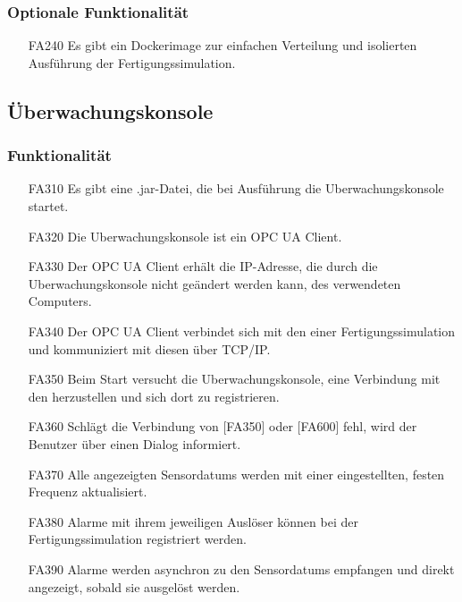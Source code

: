 \documentclass[parskip=full]{scrartcl}
\begin{document}
\subsubsection{Optionale Funktionalität}
\label{fertigung-optional}
\begin{enumerate}
  \item[FA240] Es gibt ein \gls{Dockerimage} zur einfachen Verteilung und isolierten Ausführung der \gls{Fertigungssimulation}.
\end{enumerate}

\subsection{Überwachungskonsole}
\subsubsection{Funktionalität}
\begin{enumerate}
  \item[FA310] Es gibt eine .jar-Datei, die bei Ausführung die \gls{Uberwachungskonsole} startet.
  \item[FA320] Die \gls{Uberwachungskonsole} ist ein \gls{OPC UA Client}.
  \item[FA330] Der \gls{OPC UA Client} erhält die \gls{IP-Adresse}, die durch die \gls{Uberwachungskonsole} nicht geändert werden kann, des verwendeten Computers.
  \item[FA340] Der \gls{OPC UA Client} verbindet sich mit den  einer \gls{Fertigungssimulation} und kommuniziert mit diesen über \gls{TCP/IP}.
  \item[FA350] Beim Start versucht die \gls{Uberwachungskonsole}, eine Verbindung mit den  herzustellen und sich dort zu registrieren.
  \item[FA360] Schlägt die Verbindung von [FA350] oder [FA600] fehl, wird der Benutzer über einen Dialog informiert.
  \item[FA370] Alle angezeigten \glspl{Sensordatum} werden mit einer eingestellten, festen Frequenz aktualisiert.
  \item[FA380] Alarme mit ihrem jeweiligen Auslöser können bei der \gls{Fertigungssimulation} registriert werden.
  \item[FA390] Alarme werden asynchron zu den \glspl{Sensordatum} empfangen und direkt angezeigt, sobald sie ausgelöst werden.
\end{enumerate}
\end{document}

